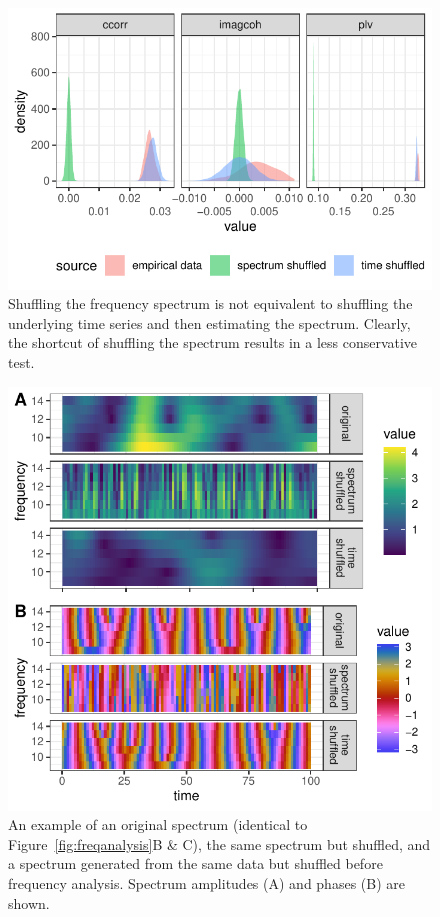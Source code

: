 \begin{figure}[!htpb]
  \includegraphics[width=\linewidth]{../stats/results/shuffledistributions.pdf}
  \caption{Shuffling the frequency spectrum is not equivalent to shuffling the underlying time series and then estimating the spectrum. Clearly, the shortcut of shuffling the spectrum results in a less conservative test.}
  \label{fig:shuffledistributions}
\end{figure}

\begin{figure}[!htpb]
  \includegraphics[width=\linewidth]{../stats/results/shufflecompare.pdf}
  \caption{An example of an original spectrum (identical to Figure~\ref{fig:freqanalysis}B \& C), the same spectrum but shuffled, and a spectrum generated from the same data but shuffled before frequency analysis. Spectrum amplitudes (A) and phases (B) are shown.}
  \label{fig:shufflecompare}
\end{figure}

